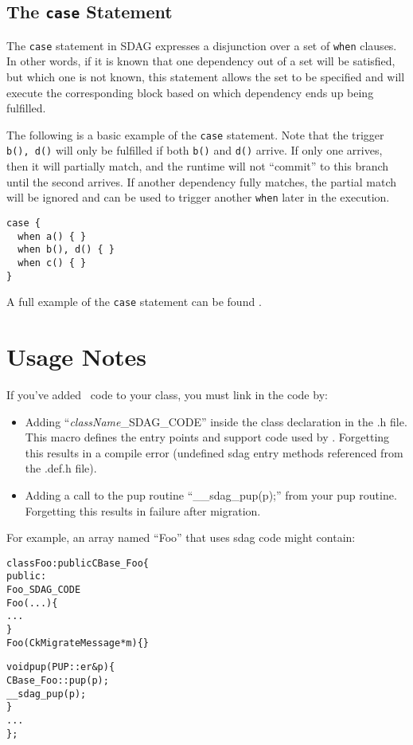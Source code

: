 \subsection{The \texttt{case} Statement}

The \texttt{case} statement in SDAG expresses a disjunction over a set of
\texttt{when} clauses. In other words, if it is known that one dependency out
of a set will be satisfied, but which one is not known, this statement allows
the set to be specified and will execute the corresponding block based on which
dependency ends up being fulfilled.

The following is a basic example of the \texttt{case} statement. Note that the
trigger \texttt{b(), d()} will only be fulfilled if both \texttt{b()} and
\texttt{d()} arrive. If only one arrives, then it will partially match, and the
runtime will not ``commit'' to this branch until the second arrives. If another
dependency fully matches, the partial match will be ignored and can be used to
trigger another \texttt{when} later in the execution.

\begin{verbatim}
case {
  when a() { }
  when b(), d() { }
  when c() { }
}
\end{verbatim}

A full example of the \texttt{case} statement can be found
.

\section{Usage Notes}

If you've added \sdag\ code to your class, you must link in the code by:
\begin{itemize}
  \item Adding ``{\it className}\_SDAG\_CODE'' inside the class declaration
     in the .h file.  This macro defines the entry points and support
     code used by \sdag{}.  Forgetting this results in a compile error
     (undefined sdag entry methods referenced from the .def.h file).
  \item Adding a call to the pup routine ``\_\_sdag\_pup(p);'' from your pup routine.
     Forgetting this results in failure after migration.
\end{itemize}
For example, an array named ``Foo'' that uses sdag code might contain:
\begin{center}
\begin{alltt}
class Foo : public CBase_Foo \{
public:
    Foo_SDAG_CODE
    Foo(...) \{
       ...
    \}
    Foo(CkMigrateMessage *m) \{ \}
    
    void pup(PUP::er &p) \{
       CBase_Foo::pup(p);
       __sdag_pup(p);
    \}
    . . .
\};
\end{alltt}
\end{center}

